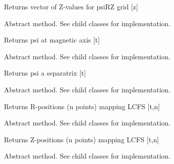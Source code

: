\documentclass[letterpaper,10pt,english]{sphinxmanual}
\begin{document}
\begin{fulllineitems}
\begin{fulllineitems}
Returns vector of Z-values for psiRZ grid {[}z{]}

\end{fulllineitems}


\begin{fulllineitems}
\label{eqtools:eqtools.core.Equilibrium.getFluxAxis}
Abstract method.  See child classes for implementation.

Returns psi at magnetic axis {[}t{]}

\end{fulllineitems}


\begin{fulllineitems}
\label{eqtools:eqtools.core.Equilibrium.getFluxLCFS}
Abstract method.  See child classes for implementation.

Returns psi a separatrix {[}t{]}

\end{fulllineitems}


\begin{fulllineitems}
\label{eqtools:eqtools.core.Equilibrium.getRLCFS}
Abstract method.  See child classes for implementation.

Returns R-positions (n points) mapping LCFS {[}t,n{]}

\end{fulllineitems}


\begin{fulllineitems}
\label{eqtools:eqtools.core.Equilibrium.getZLCFS}
Abstract method.  See child classes for implementation.

Returns Z-positions (n points) mapping LCFS {[}t,n{]}

\end{fulllineitems}


\begin{fulllineitems}
\label{eqtools:eqtools.core.Equilibrium.getFluxVol}
Abstract method.  See child classes for implementation.


\end{fulllineitems}
\end{fulllineitems}
\end{document}
